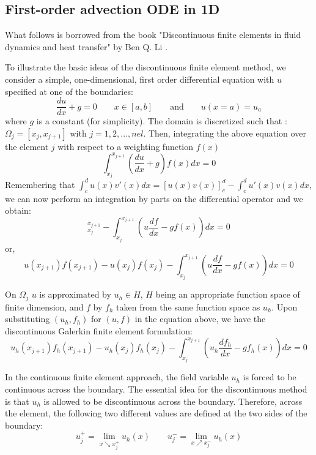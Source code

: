 

\subsection{First-order advection ODE in 1D}

What follows is borrowed from the book "Discontinuous finite elements in fluid dynamics and heat
transfer" by Ben Q. Li \cite{li06}.

To illustrate the basic ideas of the discontinuous finite element method, we
consider a simple, one-dimensional, first order differential equation with $u$
specified at one of the boundaries:
\begin{equation}
\frac{du}{dx} + g =0 \qquad x\in[a,b] \qquad \text{and} \qquad u(x=a)=u_a
\end{equation}
where $g$ is a constant (for simplicity).
The domain is discretized such that : $\Omega_j = [x_j,x_{j+1}]$ with $j = 1, 2, ..., nel$.
Then, integrating the above equation over the element $j$ with respect to a weighting function $f(x)$
\begin{equation}
\int_{x_j}^{x_{j+1}} \left( \frac{d u}{dx} + g \right) f(x) dx = 0
\end{equation}
Remembering that $\int_c^d u(x)v'(x) dx = [u(x)v(x)]_c^d - \int_c^d u'(x)v(x) dx$, 
we can now perform an integration by parts on the differential operator and we obtain:
\begin{equation}
[u(x)f(x)]_{x_j}^{x_{j+1}}  -\int_{x_j}^{x_{j+1}} \left( u \frac{d f}{dx} - g f(x)\right)  dx = 0
\end{equation}
or, 
\begin{equation}
u(x_{j+1})f(x_{j+1}) 
- u(x_{j})f(x_{j}) 
-\int_{x_j}^{x_{j+1}} \left( u \frac{d f}{dx} - g f(x)\right)  dx = 0
\end{equation}


On $\Omega_j$ $u$ is approximated by $u_h \in H$, $H$ being an appropriate function
space of finite dimension, and $f$ by $f_h$ taken from the same function space as $u_h$. 
Upon substituting $(u_h , f_h )$ for $(u,f)$ in the equation above, we have
the discontinuous Galerkin finite element formulation:
\begin{equation}
u_h(x_{j+1}) f_h(x_{j+1}) - u_h(x_{j})f_h(x_{j}) 
-\int_{x_j}^{x_{j+1}} \left( u_h \frac{d f_h}{dx} - g f_h(x)\right)  dx = 0
\end{equation}

In the continuous finite element approach, the field variable $u_h$ is forced to be
continuous across the boundary.
The essential idea for the discontinuous method is
that $u_h$ is allowed to be discontinuous across the boundary. Therefore, across the
element, the following two different values are defined at the two sides of the
boundary:
\begin{equation}
u_j^+ = \lim_{x \searrow x_j^+} u_h(x)
\qquad
u_j^- = \lim_{x \nearrow x_j^-} u_h(x)
\end{equation}

